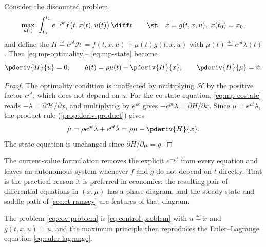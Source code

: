 \begin{proposition}\label{prop:current-value}
	Consider the discounted problem
	\begin{equation}\label{eq:discounted-control}
		\max_{u(\cdot)}\ \int_{t_0}^{t_1}e^{-\rho t}f\bigl(t,x(t),u(t)\bigr)\,\diff t
		\qquad\st\quad\dot x=g(t,x,u),\ x(t_0)=x_0,
	\end{equation}
	and define the 
	$H\eqdef e^{\rho t}\mathcal{H}=f(t,x,u)+\mu(t)g(t,x,u)$ with
	$\mu(t)\eqdef e^{\rho t}\lambda(t)$. Then \eqref{eq:mp-optimality}--%
	\eqref{eq:mp-state} become
	\begin{equation}\label{eq:current-value-conditions}
		\pderiv{H}{u}=0,
		\qquad
		\dot\mu(t)=\rho\mu(t)-\pderiv{H}{x},
		\qquad
		\pderiv{H}{\mu}=\dot x .
	\end{equation}
\end{proposition}

\begin{proof}
	The optimality condition is unaffected by multiplying $\mathcal{H}$ by the
	positive factor $e^{\rho t}$, which does not depend on $u$. For the co-state
	equation, \eqref{eq:mp-costate} reads
	$-\dot\lambda=\partial\mathcal{H}/\partial x$, and multiplying by $e^{\rho t}$
	gives $-e^{\rho t}\dot\lambda=\partial H/\partial x$. Since
	$\mu=e^{\rho t}\lambda$, the product rule
	(\autoref{prop:deriv-product}) gives
	\[
		\dot\mu=\rho e^{\rho t}\lambda+e^{\rho t}\dot\lambda
		=\rho\mu-\pderiv{H}{x} .
	\]
	The state equation is unchanged since $\partial H/\partial\mu=g$.
\end{proof}

The current-value formulation removes the explicit $e^{-\rho t}$ from every
equation and leaves an autonomous system whenever $f$ and $g$ do not depend on
$t$ directly. That is the practical reason it is preferred in economics: the
resulting pair of differential equations in $(x,\mu)$ has a phase diagram, and
the steady state and saddle path of \autoref{sec:ct-ramsey} are features of that
diagram.

\begin{proposition}\label{prop:cov-from-control}
	The problem \eqref{eq:cov-problem} is \eqref{eq:control-problem} with
	$u\eqdef\dot x$ and $g(t,x,u)=u$, and the maximum principle then reproduces the
	Euler--Lagrange equation \eqref{eq:euler-lagrange}.
\end{proposition}

